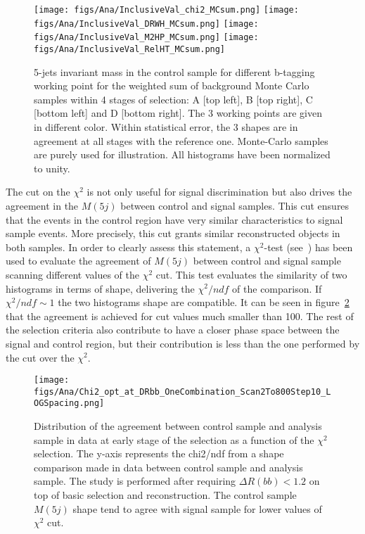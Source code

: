 \begin{figure}[!Hhtbp]
  \begin{center}
    \texttt{[image: figs/Ana/InclusiveVal\_chi2\_MCsum.png]}
    \texttt{[image: figs/Ana/InclusiveVal\_DRWH\_MCsum.png]}
    \texttt{[image: figs/Ana/InclusiveVal\_M2HP\_MCsum.png]}
    \texttt{[image: figs/Ana/InclusiveVal\_RelHT\_MCsum.png]}
    \caption{5-jets invariant mass in the control sample for different b-tagging working point for the weighted sum of background Monte Carlo samples within 4 stages of selection: A [top left], B [top right], C [bottom left] and D [bottom right]. The 3 working points are given in different color. Within statistical error, the 3 shapes are in agreement at all stages with the reference one. Monte-Carlo samples are purely used for illustration. All histograms have been normalized to unity.}
    \label{fig:StageWPSum}
  \end{center}
\end{figure}

The cut on the $\chi^{2}$ is not only useful for signal discrimination but also drives the agreement in the $M(5j)$ between control and signal samples. This cut ensures that the events in the control region have very similar characteristics to signal sample events. More precisely, this cut grants similar reconstructed objects in both samples. In order to clearly assess this statement, a $\chi^{2}$-test (see~\cite{2006physics...5123G}) has been used to evaluate the agreement of $M(5j)$ between control and signal sample scanning different values of the $\chi^{2}$ cut. This test evaluates the similarity of two histograms in terms of shape, delivering the $\chi^{2}/ndf$ of the comparison. If $\chi^{2}/ndf\sim 1$ the two histograms shape are compatible. It can be seen in figure~\ref{fig:optchi2} that the agreement is achieved for cut values much smaller than 100. The rest of the selection criteria also contribute to have a closer phase space between the signal and control region, but their contribution is less than the one performed by the cut over the $\chi^{2}$.

\begin{figure}[!Hhtbp]
  \begin{center}
    \texttt{[image: figs/Ana/Chi2\_opt\_at\_DRbb\_OneCombination\_Scan2To800Step10\_LOGSpacing.png]} %
    \caption{Distribution of the agreement between control sample and analysis sample in data at early stage of the selection as a function of the $\chi^2$ selection. The y-axis represents the chi2/ndf from a shape comparison made in data between control sample and analysis sample. The study is performed after requiring $\Delta R(bb) <1.2$ on top of basic selection and reconstruction. The control sample $M(5j)$ shape tend to agree with signal sample for lower values of $\chi^2$ cut.}
    \label{fig:optchi2}
  \end{center}
\end{figure}

